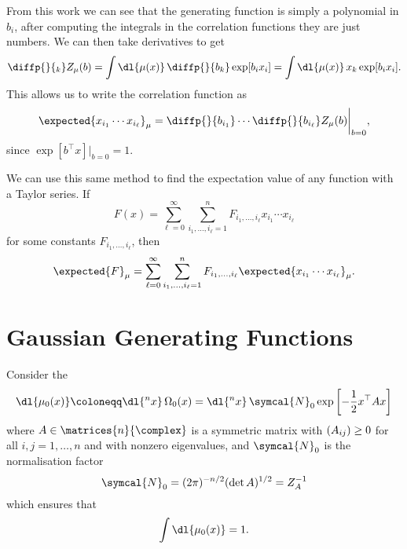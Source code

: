 \documentclass[fleqn]{NotesClass}
\let\Re\relax
\DeclareMathOperator{\Re}{Re}
\newcommand{\trans}{{\top}}
\begin{document}
    From this work we can see that the generating function is simply a polynomial in \(b_i\), after computing the integrals in the correlation functions they are just numbers.
    We can then take derivatives to get
    \begin{equation}
        \diffp{}{_k} Z_\mu(b) = \int \dl{\mu(x)} \, \diffp{}{b_k} \exp[b_ix_i] = \int \dl{\mu(x)} \, x_k \exp[b_ix_i].
    \end{equation}
    This allows us to write the correlation function as
    \begin{equation}
        \expected{x_{i_1} \dotsm x_{i_\ell}}_\mu = \diffp{}{b_{i_1}} \dotsm \diffp{}{b_{i_\ell}} Z_\mu(b) \bigg|_{b = 0},
    \end{equation}
    since \(\exp[b^\trans x]|_{b = 0} = 1\).
    
    We can use this same method to find the expectation value of any function with a Taylor series.
    If
    \begin{equation}\label{eqn:taylor series}
        F(x) = \sum_{\ell = 0}^{\infty} \sum_{i_1, \dotsc, i_{\ell} = 1}^{n} F_{i_1, \dotsc, i_{\ell}} x_{i_1} \dotsm x_{i_\ell}
    \end{equation}
    for some constants \(F_{i_1, \dotsc, i_{\ell}}\), then
    \begin{equation}
        \expected{F}_\mu = \sum_{\ell = 0}^{\infty} \sum_{i_1, \dotsc, i_{\ell} = 1}^{n} F_{i_1, \dotsc, i_{\ell}} \expected{x_{i_1} \dotsm x_{i_\ell}}_\mu.
    \end{equation}
    
    \section{Gaussian Generating Functions}
    Consider the 
    \begin{equation}
        \dl{\mu_0(x)} \coloneqq \dl{^nx} \, \Omega_0(x) = \dl{^n x} \, \symcal{N}_0 \exp\left[ -\frac{1}{2} x^\trans A x \right]
    \end{equation}
    where \(A \in \matrices{n}{\complex}\) is a symmetric matrix with \(\Re(A_{ij}) \ge 0\) for all \(i, j = 1, \dotsc, n\) and with nonzero eigenvalues, and \(\symcal{N}_0\) is the normalisation factor
    \begin{equation}
        \symcal{N}_0 = (2\pi)^{-n/2} (\det A)^{1/2} = Z_A^{-1}
    \end{equation}
    which ensures that
    \begin{equation}
        \int \dl{\mu_0(x)} = 1.
    \end{equation}
    
\end{document}
